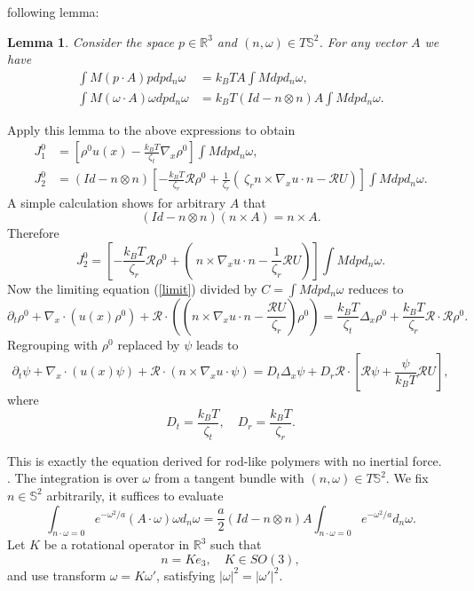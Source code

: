 \documentclass[reqno]{amsart}
\numberwithin{equation}{section}
\newtheorem{Lemma}{Lemma}[section]
\theoremstyle{definition}
\theoremstyle{remark}
\begin{document}
following lemma:
\begin{Lemma}\label{jj}
Consider the space $p\in \mathbb{R}^3$ and $(n, \omega)\in
T\mathbb{S}^2$.
For any vector $A$ we have
\begin{align}
\int M(p\cdot A)pdpd_n\omega &= k_BT A\int M dp d_n\omega,\\
\int M(\omega \cdot A)\omega dp d_n\omega &= k_BT (Id-n\otimes n)A\int Mdp d_n\omega.
\end{align}
\end{Lemma}
Apply this lemma to the above expressions to obtain
\begin{align}
J_1^0&= [\rho^0 u(x)-\frac{k_BT}{\zeta_t}\nabla_x \rho^0]\int Mdp d_n\omega,\\
J_2^0 &=(Id-n\otimes n)\left[-\frac{k_BT}{\zeta_r} \mathcal{R}\rho^0 +\frac{1}{\zeta_r}  \left( \
\zeta_r n\times \nabla_x u\cdot n-\mathcal{R}U \right)\right]\int Mdp d_n\omega.
\end{align}
A simple calculation shows for arbitrary $A$ that
$$
(Id-n\otimes n)(n\times A)=n\times A.
$$
Therefore
$$
J_2^0=\left[-\frac{k_BT}{\zeta_r} \mathcal{R}\rho^0 + \left( \
 n\times \nabla_x u\cdot n-\frac{1}{\zeta_r}  \mathcal{R}U \right)\right]\int Mdp d_n\omega.
$$
Now the limiting equation (\ref{limit}) divided  by $C=\int Mdpd_n\omega$  reduces to
$$
\partial_t \rho^0 + \nabla_x\cdot(u(x)\rho^0) +\mathcal{R}\cdot ((n\times  \nabla_x u \cdot n-\frac{\mathcal{R}U}{\zeta_r})\rho^0)=
\frac{k_BT}{\zeta_t}\Delta_x \rho^0 +\frac{k_BT}{\zeta_r}\mathcal{R}\cdot \mathcal{R} \rho^0.
$$
Regrouping with $\rho^0$ replaced by $\psi$ leads to
$$
\partial_t \psi +\nabla_x\cdot(u(x)\psi) +\mathcal{R}\cdot(n\times \nabla_xu \cdot \psi)=D_t\Delta_x \psi +D_r \mathcal{R}\cdot \left[\mathcal{R}\psi +\frac{\psi}{k_B T}\mathcal{R}U \right],
$$
where
$$
D_t=\frac{k_BT}{\zeta_t}, \quad D_r=\frac{k_BT}{\zeta_r}.
$$

This is exactly the equation derived for rod-like polymers with no inertial force. \\

\noindent {\bf Proof of Lemma \ref{jj}}.  The integration is over
$\omega$ from a tangent bundle with $(n, \omega)\in T \mathbb{S}^2$.
We fix $n\in \mathbb{S}^2$ arbitrarily, it suffices to evaluate
$$
\int _{ n\cdot \omega=0} e^{-\omega^2/a}(A\cdot \omega)\omega d_n\omega=\frac{a}{2}(Id-n\otimes n)A \int _{n\cdot \omega=0} e^{-\omega^2/a}d_n\omega.
$$
Let $K$ be a rotational operator in $\mathbb{R}^3$ such that
$$
n=Ke_3, \quad K\in SO(3),
$$
and use transform $\omega=K \omega'$, satisfying
$|\omega|^2=|\omega'|^2$.
\end{document}
